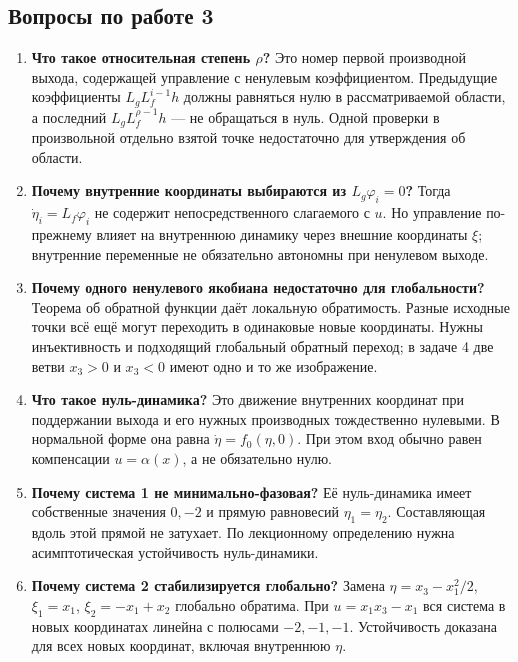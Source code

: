\subsection{Вопросы по работе 3}

\begin{enumerate}[resume]
\item \textbf{Что такое относительная степень $\rho$?}
Это номер первой производной выхода, содержащей управление с ненулевым
коэффициентом. Предыдущие коэффициенты $L_gL_f^{i-1}h$ должны равняться нулю
в рассматриваемой области, а последний $L_gL_f^{\rho-1}h$ --- не обращаться
в нуль. Одной проверки в произвольной отдельно взятой точке недостаточно
для утверждения об области.

\item \textbf{Почему внутренние координаты выбираются из $L_g\varphi_i=0$?}
Тогда $\dot\eta_i=L_f\varphi_i$ не содержит непосредственного слагаемого
с $u$. Но управление по-прежнему влияет на внутреннюю динамику через
внешние координаты $\xi$; внутренние переменные не обязательно автономны
при ненулевом выходе.

\item \textbf{Почему одного ненулевого якобиана недостаточно для глобальности?}
Теорема об обратной функции даёт локальную обратимость.
Разные исходные точки всё ещё могут переходить в одинаковые новые
координаты. Нужны инъективность и подходящий глобальный обратный переход;
в задаче 4 две ветви $x_3>0$ и $x_3<0$ имеют одно и то же изображение.

\item \textbf{Что такое нуль-динамика?}
Это движение внутренних координат при поддержании выхода и его нужных
производных тождественно нулевыми. В нормальной форме она равна
$\dot\eta=f_0(\eta,0)$. При этом вход обычно равен компенсации
$u=\alpha(x)$, а не обязательно нулю.

\item \textbf{Почему система 1 не минимально-фазовая?}
Её нуль-динамика имеет собственные значения $0,-2$ и прямую равновесий
$\eta_1=\eta_2$. Составляющая вдоль этой прямой не затухает.
По лекционному определению нужна асимптотическая устойчивость нуль-динамики.

\item \textbf{Почему система 2 стабилизируется глобально?}
Замена $\eta=x_3-x_1^2/2$, $\xi_1=x_1$, $\xi_2=-x_1+x_2$
глобально обратима. При $u=x_1x_3-x_1$ вся система в новых координатах
линейна с полюсами $-2,-1,-1$. Устойчивость доказана для всех новых
координат, включая внутреннюю $\eta$.


\end{enumerate}
